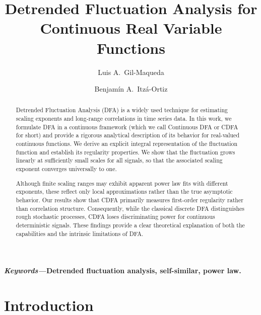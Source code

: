 \documentclass{amsart}
\title[DFA for continuous real variable functions]{Detrended Fluctuation Analysis for Continuous Real Variable Functions}
\author{Luis A.~Gil-Maqueda}
\author{Benjam\'in A.~Itz\'a-Ortiz}
\begin{document}
   

\begin{abstract}
Detrended Fluctuation Analysis (DFA) is a widely used technique for estimating scaling exponents and long-range correlations in time series data. In this work, we formulate DFA in a continuous framework (which we call Continuous DFA or CDFA for short) and provide a rigorous analytical description of its behavior for real-valued continuous functions. We derive an explicit integral representation of the fluctuation function and establish its regularity properties. We show that the fluctuation grows linearly at sufficiently small scales for all signals, so that the associated scaling exponent converges universally to one.

Although finite scaling ranges may exhibit apparent power law fits with different exponents, these reflect only local approximations rather than the true asymptotic behavior. Our results show that CDFA primarily measures first-order regularity rather than correlation structure. Consequently, while the classical discrete DFA distinguishes rough stochastic processes, CDFA loses discriminating power for continuous deterministic signals. These findings provide a clear theoretical explanation of both the capabilities and the intrinsic limitations of DFA.
\end{abstract}
 \maketitle     
    
    \textbf{\textit{Keywords---}Detrended fluctuation analysis, self-similar, power law.}
   
   \section*{Introduction} 
\indent 
\end{document}
